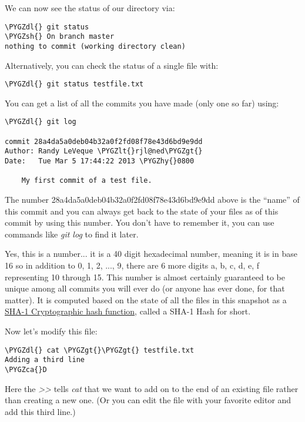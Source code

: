 \documentclass[letterpaper,10pt,english]{sphinxmanual}
\def\PYGZca{\char`\^}
\def\PYGZlt{\char`\<}
\def\PYGZgt{\char`\>}
\def\PYGZsh{\char`\#}
\def\PYGZdl{\char`\$}
\def\PYGZhy{\char`\-}
\begin{document}
\begin{enumerate}
We can now see the status of our directory via:

\begin{Verbatim}[commandchars=\\\{\}]
\PYGZdl{} git status
\PYGZsh{} On branch master
nothing to commit (working directory clean)
\end{Verbatim}

Alternatively, you can check the status of a single file with:

\begin{Verbatim}[commandchars=\\\{\}]
\PYGZdl{} git status testfile.txt
\end{Verbatim}

You can get a list of all the commits you have made (only one so far)
using:

\begin{Verbatim}[commandchars=\\\{\}]
\PYGZdl{} git log

commit 28a4da5a0deb04b32a0f2fd08f78e43d6bd9e9dd
Author: Randy LeVeque \PYGZlt{}rjl@ned\PYGZgt{}
Date:   Tue Mar 5 17:44:22 2013 \PYGZhy{}0800

    My first commit of a test file.
\end{Verbatim}

The number 28a4da5a0deb04b32a0f2fd08f78e43d6bd9e9dd above is the ``name''
of this commit and you can always get back to the state of your files as
of this commit by using this number.  You don't have to remember it, you
can use commands like \emph{git log} to find it later.

Yes, this is a number... it is a 40 digit hexadecimal number, meaning it
is in base 16 so in addition to 0, 1, 2, ..., 9, there are 6 more digits
a, b, c, d, e, f representing 10 through 15.  This number is almost
certainly guaranteed to be unique among all commits you will ever
do (or anyone has ever done, for that matter).  It is computed based
on the state of all the files in this snapshot as a \href{http://en.wikipedia.org/wiki/SHA-1}{SHA-1
Cryptographic hash function},
called a SHA-1 Hash for short.

Now let's modify this file:

\begin{Verbatim}[commandchars=\\\{\}]
\PYGZdl{} cat \PYGZgt{}\PYGZgt{} testfile.txt
Adding a third line
\PYGZca{}D
\end{Verbatim}

Here the \emph{\textgreater{}\textgreater{}} tells \emph{cat} that we want to add on to the end of an
existing file rather than creating a new one.  (Or you can edit the file
with your favorite editor and add this third line.)


\end{enumerate}
\end{document}
